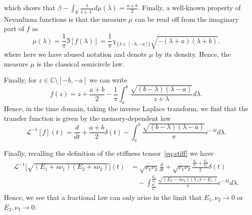 which shows that $\beta - \int_\mathbb{R} \tfrac{\lambda}{1 + \lambda^2}d\mu(\lambda) = \tfrac{a+b}{2}$. Finally, a well-known property of Nevanlinna functions is that the measure $\mu$ can be read off from the imaginary part of $f$ as
\begin{equation}
    \mu(\lambda) = \frac{1}{\pi}\Im[f(\lambda)] = \frac{1}{\pi}\chi_{\{\lambda \in [-b, -a]\}}\sqrt{-(\lambda + a)(\lambda + b)}.
\end{equation}
where here we have abused notation and denote $\mu$ by its density. Hence, the measure $\mu$ is the classical semicircle law.

Finally, for $z \in \mathbb{C} \setminus [-b, -a]$ we can write
\begin{equation}
    f(z) = z + \frac{a + b}{2} - \frac{1}{\pi}\int_{a}^{b} \frac{\sqrt{(b - \lambda)(\lambda - a)}}{z + \lambda}d\lambda.
\end{equation}
Hence, in the time domain, taking the inverse Laplace transform, we find that the transfer function is given by the memory-dependent law
\begin{equation}
    \mathcal{L}^{-1}[f](t) = \frac{d}{dt} + \frac{a + b}{2}\delta(t) - \int_a^b \frac{\sqrt{(b - \lambda)(\lambda - a)}}{\pi}e^{-\lambda t} d\lambda.
\end{equation}

Finally, recalling the definition of the stiffness tensor~\cref{eq:stiff} we have
\begin{equation}
\begin{aligned}
    \mathcal{L}^{-1}\Big[\sqrt{(E_1 + s\nu_1)(E_2 + s\nu_2)}\Big](t) &= \sqrt{\nu_1\nu_2}\frac{d}{dt} + \sqrt{\nu_1\nu_2}\frac{\tfrac{E_1}{\nu_1} + \tfrac{E_2}{\nu_2}}{2}\delta(t)\\
    &\quad- \int_{\tfrac{E_1}{\nu_1}}^{\tfrac{E_2}{\nu_2}} \frac{\sqrt{(E_2 - \lambda\nu_2)(\mathbb{V}_1\lambda - E_1)}}{\pi}e^{-\lambda t} d\lambda.
\end{aligned}
\end{equation}
Hence, we see that a fractional law can only arise in the limit that $E_1, \nu_2 \to 0$ or $E_2, \nu_1 \to 0$.